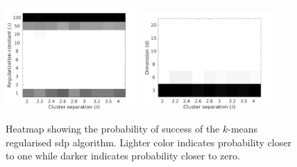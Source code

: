 \documentclass[12pt]{article}
\begin{document}
\begin{figure}[t]
  \centering
  \includegraphics[width=0.45\textwidth]{figures/optimizationClustering/deltaLambda.png}
  \includegraphics[width=0.45\textwidth]{figures/optimizationClustering/deltaD.png}
  \caption{Heatmap showing the probability of success of the $k$-means regularised sdp algorithm. Lighter color indicates probability closer to one while darker indicates probability closer to zero.}
  \label{a-figure:simulationSepL}
\end{figure}
\end{document}
